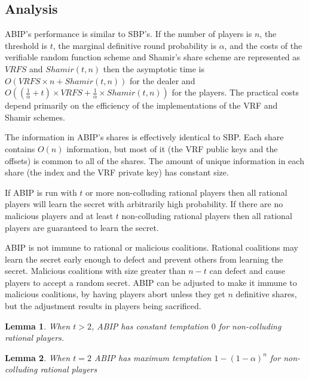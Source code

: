 \documentclass{dalcsthesis}
\newtheorem{lemma}{Lemma}
\begin{document}
\subsection{Analysis}

ABIP's performance is similar to SBP's. If the number of players is $n$, the threshold is $t$, the marginal definitive round probability is $\alpha$, and the costs of the verifiable random function scheme and Shamir's share scheme are represented as $VRFS$ and $Shamir(t, n)$ then the asymptotic time is $O(VRFS \times n + Shamir(t, n))$ for the dealer and $O((\frac{1}{\alpha} + t) \times VRFS + \frac{1}{\alpha} \times Shamir(t, n))$ for the players. The practical costs depend primarily on the efficiency of the implementations of the VRF and Shamir schemes.

The information in ABIP's shares is effectively identical to SBP. Each share contains $O(n)$ information, but most of it (the VRF public keys and the offsets) is common to all of the shares. The amount of unique information in each share (the index and the VRF private key) has constant size.

If ABIP is run with $t$ or more non-colluding rational players then all rational players will learn the secret with arbitrarily high probability. If there are no malicious players and at least $t$ non-colluding rational players then all rational players are guaranteed to learn the secret.

ABIP is not immune to rational or malicious coalitions. Rational coalitions may learn the secret early enough to defect and prevent others from learning the secret. Malicious coalitions with size greater than $n-t$ can defect and cause players to accept a random secret. ABIP can be adjusted to make it immune to malicious coalitions, by having players abort unless they get $n$ definitive shares, but the adjustment results in players being sacrificed.

\begin{lemma} When $t > 2$, ABIP has constant temptation $0$ for non-colluding rational players. \end{lemma}

\begin{lemma} When $t = 2$ ABIP has maximum temptation $1 - (1 - \alpha)^n$ for non-colluding rational players \end{lemma}
\end{document}
